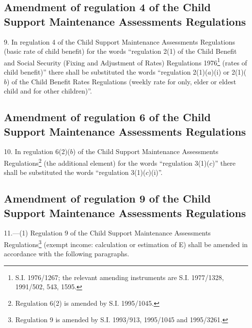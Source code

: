 \documentclass[12pt,a4paper]{article}
\begin{document}
\subsection[9. Amendment of regulation 4 of the Child Support Maintenance Assessments Regulations]{Amendment of regulation 4 of the Child Support Maintenance Assessments Regulations}

9.  In regulation 4 of the Child Support Maintenance Assessments Regulations (basic rate of child benefit) for the words “regulation 2(1) of the Child Benefit and Social Security (Fixing and Adjustment of Rates) Regulations 1976\footnote{\frenchspacing S.I. 1976/1267; the relevant amending instruments are S.I. 1977/1328, 1991/502, 543, 1595.} (rates of child benefit)” there shall be substituted the words “regulation 2(1)($a$)(i) or 2(1)($b$) of the Child Benefit Rates Regulations (weekly rate for only, elder or eldest child and for other children)”.

\subsection[10. Amendment of regulation 6 of the Child Support Maintenance Assessments Regulations]{Amendment of regulation 6 of the Child Support Maintenance Assessments Regulations}

10.  In regulation 6(2)($b$) of the Child Support Maintenance Assessments Regulations\footnote{\frenchspacing Regulation 6(2) is amended by S.I. 1995/1045.} (the additional element) for the words “regulation 3(1)($c$)” there shall be substituted the words “regulation 3(1)($c$)(i)”.

\subsection[11. Amendment of regulation 9 of the Child Support Maintenance Assessments Regulations]{Amendment of regulation 9 of the Child Support Maintenance Assessments Regulations}

11.—(1) Regulation 9 of the Child Support Maintenance Assessments Regulations\footnote{\frenchspacing Regulation 9 is amended by S.I. 1993/913, 1995/1045 and 1995/3261.} (exempt income: calculation or estimation of E) shall be amended in accordance with the following paragraphs.
\end{document}
